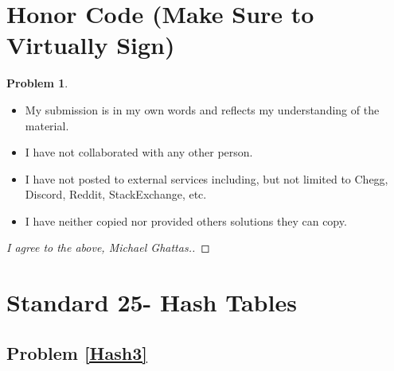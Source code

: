 \documentclass[11pt]{article}
\theoremstyle{definition}
\theoremstyle{definition}
\newtheorem{required}{Problem}
\theoremstyle{definition}
\begin{document}
\section{Honor Code (Make Sure to Virtually Sign)} \label{HonorCode}

\begin{required}
\noindent 
\begin{itemize}
\item My submission is in my own words and reflects my understanding of the material.
\item I have not collaborated with any other person.
\item I have not posted to external services including, but not limited to Chegg, Discord, Reddit, StackExchange, etc.
\item I have neither copied nor provided others solutions they can copy.
\end{itemize}

\end{required}

\begin{proof}[I agree to the above, Michael Ghattas.]
\end{proof}


\newpage
\section{Standard 25- Hash Tables}
\subsection{Problem \ref{Hash3}}
\end{document}
